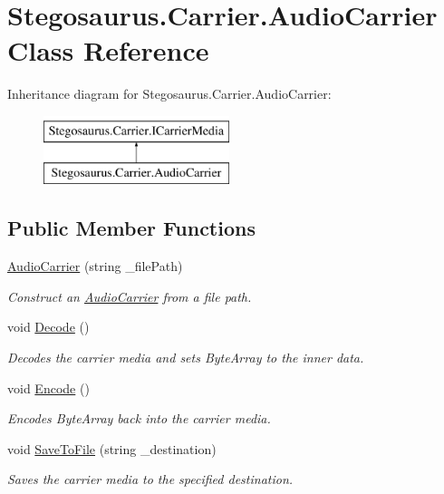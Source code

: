 \hypertarget{class_stegosaurus_1_1_carrier_1_1_audio_carrier}{}\section{Stegosaurus.\+Carrier.\+Audio\+Carrier Class Reference}
\label{class_stegosaurus_1_1_carrier_1_1_audio_carrier}
Inheritance diagram for Stegosaurus.\+Carrier.\+Audio\+Carrier\+:\begin{figure}[H]
\begin{center}
\leavevmode
\includegraphics[height=2.000000cm]{class_stegosaurus_1_1_carrier_1_1_audio_carrier}
\end{center}
\end{figure}
\subsection*{Public Member Functions}
\begin{DoxyCompactItemize}
\item 
\hyperlink{class_stegosaurus_1_1_carrier_1_1_audio_carrier_abf7e6bb9093fdb385f11d19f1ef188dd}{Audio\+Carrier} (string \+\_\+file\+Path)
\begin{DoxyCompactList}\small\item\em Construct an \hyperlink{class_stegosaurus_1_1_carrier_1_1_audio_carrier}{Audio\+Carrier} from a file path. \end{DoxyCompactList}\item 
void \hyperlink{class_stegosaurus_1_1_carrier_1_1_audio_carrier_a2d02a6c7c6ceda7a0a956ca2ab92a03d}{Decode} ()
\begin{DoxyCompactList}\small\item\em Decodes the carrier media and sets Byte\+Array to the inner data. \end{DoxyCompactList}\item 
void \hyperlink{class_stegosaurus_1_1_carrier_1_1_audio_carrier_aacb57072610e4c5d59496d7e9c2262f0}{Encode} ()
\begin{DoxyCompactList}\small\item\em Encodes Byte\+Array back into the carrier media. \end{DoxyCompactList}\item 
void \hyperlink{class_stegosaurus_1_1_carrier_1_1_audio_carrier_ac703d4709853222c6dcc98d12f6c9130}{Save\+To\+File} (string \+\_\+destination)
\begin{DoxyCompactList}\small\item\em Saves the carrier media to the specified destination. \end{DoxyCompactList}\end{DoxyCompactItemize}
